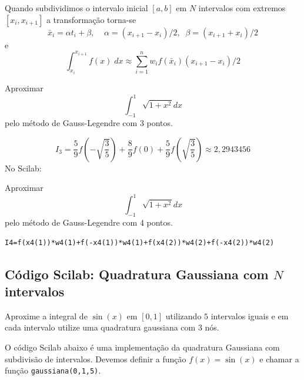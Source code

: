 Quando subdividimos o intervalo inicial $[a,b]$ em $N$ intervalos com extremos $[x_i,x_{i+1}]$ a transformação torna-se
$$
  \bar{x}_i = \alpha t_i + \beta, \;\;  \;\; \alpha =(x_{i+1}-x_i)/2, \;\; \beta = (x_{i+1}+x_i)/2 
$$
e
$$
 \int_{x_i}^{x_{i+1}} f(x) \; dx \approx \sum_{i=1}^n w_i f( \bar{x}_i ) (x_{i+1}-x_i)/2
$$

\begin{ex} Aproximar
  \begin{equation*}
    \int_{-1}^1\sqrt{1+x^2}dx  
  \end{equation*}
pelo método de Gauss-Legendre com 3 pontos.
\end{ex}
\begin{sol}
 \begin{equation*}
  I_3=\frac{5}{9}f\left(-\sqrt{\frac{3}{5}}\right)+\frac{8}{9}f(0)+\frac{5}{9}f\left(\sqrt{\frac{3}{5}}\right) \approx 2,2943456
\end{equation*}
\ifisscilab
No Scilab:

\fi 
\end{sol}

\ifisscilab
\begin{ex} Aproximar
$$\int_{-1}^1\sqrt{1+x^2}dx$$
pelo método de Gauss-Legendre com 4 pontos.
\end{ex}
\begin{sol}
\begin{verbatim}
I4=f(x4(1))*w4(1)+f(-x4(1))*w4(1)+f(x4(2))*w4(2)+f(-x4(2))*w4(2)
\end{verbatim}  
\end{sol}
\fi

\ifisscilab
\subsection{Código Scilab: Quadratura Gaussiana com $N$ intervalos}
\begin{ex}
Aproxime a integral de $\sin(x)$ em $[0,1]$ utilizando $5$ intervalos iguais e em cada intervalo utilize uma quadratura gaussiana com $3$ nós. 
\end{ex}

O código Scilab abaixo é uma implementação da quadratura Gaussiana com subdivisão de intervalos. Devemos definir a função $f(x)=\sin(x)$ e chamar a função \verb#gaussiana(0,1,5)#.


\fi





